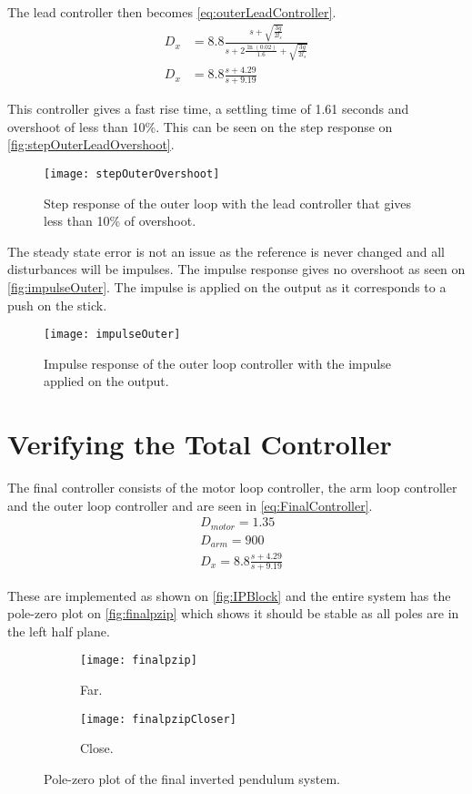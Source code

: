 The lead controller then becomes \autoref{eq:outerLeadController}.
\begin{subequations}
\begin{flalign}
D_x&=8.8\frac{s+\sqrt{\frac{3g}{2l_s}}}{s+2\frac{\ln(0.02)}{1.6}+\sqrt{\frac{3g}{2l_s}}} \\ 
D_x&=8.8\frac{s+4.29}{s+9.19} \label{eq:outerLeadController}
\end{flalign}
\end{subequations}

This controller gives a fast rise time, a settling time of 1.61 seconds and overshoot of less than 10\%. This can be seen on the step response on \autoref{fig:stepOuterLeadOvershoot}.
\begin{figure}[htbp]
\centering
\texttt{[image: stepOuterOvershoot]}
\caption{Step response of the outer loop with the lead controller that gives less than 10\% of overshoot.}
\label{fig:stepOuterLeadOvershoot}
\end{figure}

The steady state error is not an issue as the reference is never changed and all disturbances will be impulses. The impulse response gives no overshoot as seen on \autoref{fig:impulseOuter}. The impulse is applied on the output as it corresponds to a push on the stick.
\begin{figure}
\centering
\texttt{[image: impulseOuter]}
\caption{Impulse response of the outer loop controller with the impulse applied on the output.}
\label{fig:impulseOuter}
\end{figure}
\newpage

\section{Verifying the Total Controller}
The final controller consists of the motor loop controller, the arm loop controller and the outer loop controller and are seen in \autoref{eq:FinalController}.
\begin{subequations}\label{eq:FinalController}
\begin{flalign}
&D_{motor}=1.35 \\
&D_{arm}=900 \\
&D_x=8.8\frac{s+4.29}{s+9.19}
\end{flalign}
\end{subequations}

These are implemented as shown on \autoref{fig:IPBlock} and the entire system has the pole-zero plot on \autoref{fig:finalpzip} which shows it should be stable as all poles are in the left half plane.
\begin{figure}[htbp]
\centering
	\begin{subfigure}{0.45\textwidth}
	\texttt{[image: finalpzip]}
	\caption{Far.}
	\end{subfigure}
	\begin{subfigure}{0.45\textwidth}
	\texttt{[image: finalpzipCloser]}
	\caption{Close.}
	\end{subfigure}
\caption{Pole-zero plot of the final inverted pendulum system.}
\label{fig:finalpzip}
\end{figure}

